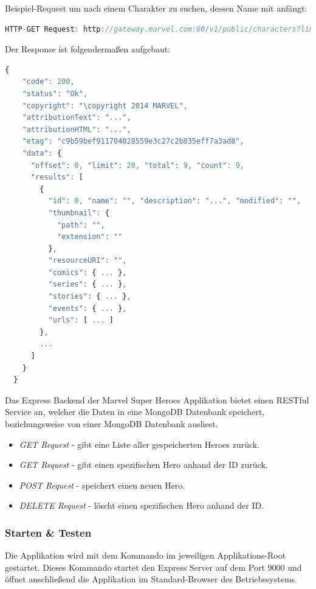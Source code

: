 \newpage
Beispiel-Request um nach einem Charakter zu suchen, dessen Name mit  anfängt:
\begin{lstlisting}[language=JavaScript]
  HTTP-GET Request: http://gateway.marvel.com:80/v1/public/characters?limit=20&nameStartsWith=Hulk&apikey=<apikey>
\end{lstlisting}

Der Response ist folgendermaßen aufgebaut:
\begin{lstlisting}[language=JavaScript]
  {
    "code": 200,
    "status": "Ok",
    "copyright": "\copyright 2014 MARVEL",
    "attributionText": "...",
    "attributionHTML": "...",
    "etag": "c9b59bef911704028559e3c27c2b835eff7a3ad8",
    "data": {
      "offset": 0, "limit": 20, "total": 9, "count": 9,
      "results": [
        {
          "id": 0, "name": "", "description": "...", "modified": "",
          "thumbnail": {
            "path": "",
            "extension": ""
          },
          "resourceURI": "",
          "comics": { ... },
          "series": { ... },
          "stories": { ... },
          "events": { ... },
          "urls": [ ... ]
        },
        ...
      ]
    }
  }
\end{lstlisting}

Das Express Backend der Marvel Super Heroes Applikation bietet einen RESTful  Service an, welcher die Daten in eine MongoDB Datenbank speichert, beziehungsweise von einer MongoDB Datenbank ausliest.
\begin{itemize}
  \item \textit{GET Request } - gibt eine Liste aller gespeicherten Heroes zurück.
  \item \textit{GET Request } - gibt einen spezifischen Hero anhand der ID zurück.
  \item \textit{POST Request } - speichert einen neuen Hero.
  \item \textit{DELETE Request } - löscht einen spezifischen Hero anhand der ID.
\end{itemize}

\newpage
\subsubsection{Starten \& Testen}
Die Applikation wird mit dem Kommando  im jeweiligen Applikations-Root gestartet. Dieses Kommando startet den Express Server auf dem Port 9000 und öffnet anschließend die Applikation im Standard-Browser des Betriebssystems.

